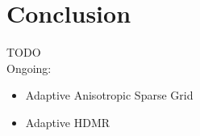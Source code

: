 \documentclass[11pt]{article}
\begin{document}
\section{Conclusion}
TODO\\Ongoing:
\begin{itemize}
\item Adaptive Anisotropic Sparse Grid
\item Adaptive HDMR
\end{itemize}
%
\end{document}
